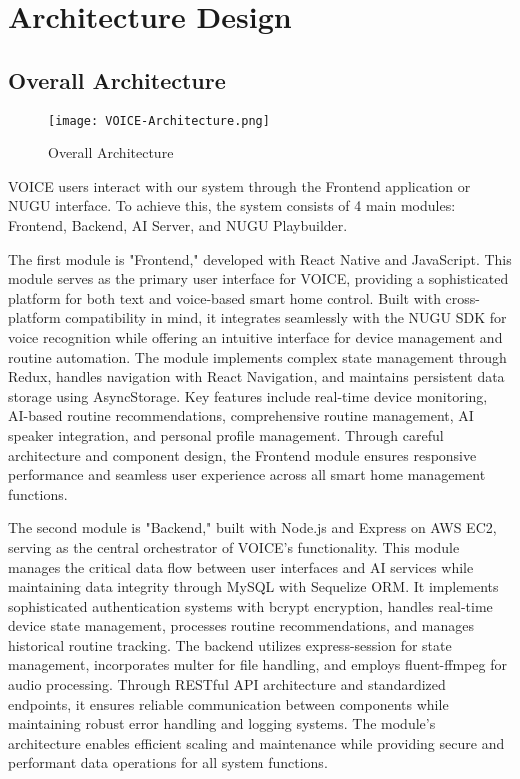 \documentclass[conference]{IEEEtran}
\begin{document}
\vspace{1em} %

\section{Architecture Design}

\subsection{Overall Architecture}
\vspace{0.5em}

\begin{figure} [h!]
	\centering
	\texttt{[image: VOICE-Architecture.png]}
	\caption{Overall Architecture}
	\label{fig:Overall Architecture}
\end{figure}

VOICE users interact with our system through the Frontend application or NUGU interface. To achieve this, the system consists of 4 main modules: Frontend, Backend, AI Server, and NUGU Playbuilder.

The first module is "Frontend," developed with React Native and JavaScript. This module serves as the primary user interface for VOICE, providing a sophisticated platform for both text and voice-based smart home control. Built with cross-platform compatibility in mind, it integrates seamlessly with the NUGU SDK for voice recognition while offering an intuitive interface for device management and routine automation. The module implements complex state management through Redux, handles navigation with React Navigation, and maintains persistent data storage using AsyncStorage. Key features include real-time device monitoring, AI-based routine recommendations, comprehensive routine management, AI speaker integration, and personal profile management. Through careful architecture and component design, the Frontend module ensures responsive performance and seamless user experience across all smart home management functions.

\newpage

The second module is "Backend," built with Node.js and Express on AWS EC2, serving as the central orchestrator of VOICE's functionality. This module manages the critical data flow between user interfaces and AI services while maintaining data integrity through MySQL with Sequelize ORM. It implements sophisticated authentication systems with bcrypt encryption, handles real-time device state management, processes routine recommendations, and manages historical routine tracking. The backend utilizes express-session for state management, incorporates multer for file handling, and employs fluent-ffmpeg for audio processing. Through RESTful API architecture and standardized endpoints, it ensures reliable communication between components while maintaining robust error handling and logging systems. The module's architecture enables efficient scaling and maintenance while providing secure and performant data operations for all system functions.
\end{document}
